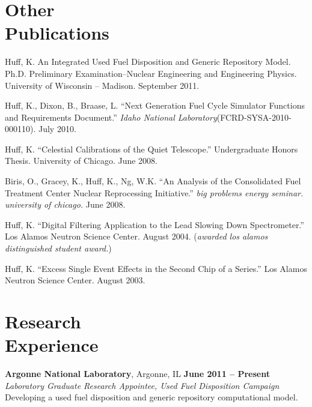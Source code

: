 \documentclass[margin,line]{resume}
\begin{document}
\begin{resume}
    \section{\mysidestyle Other\\Publications}
    \begin{bibenum}
      \item Huff, K. An Integrated Used Fuel Disposition and Generic Repository Model. 
        Ph.D. Preliminary Examination--Nuclear Engineering and Engineering 
        Physics. University of Wisconsin -- Madison.  September 2011. 
      \item Huff, K., Dixon, B., Braase, L. ``Next Generation Fuel Cycle Simulator Functions and Requirements Document.'' 
        \emph{Idaho National Laboratory}(FCRD-SYSA-2010-000110). July 2010. 
      \item Huff, K. ``Celestial Calibrations of the Quiet Telescope.''
        Undergraduate Honors Thesis. University of Chicago. June 2008.
      \item Biris, O., Gracey, K., Huff, K., Ng, W.K.  
        ``An Analysis of the Consolidated Fuel Treatment Center Nuclear 
        Reprocessing Initiative.''
        \emph{big problems energy seminar. university of chicago.} June 2008.
      \item Huff, K. ``Digital Filtering Application to the Lead Slowing Down 
        Spectrometer.'' Los Alamos Neutron Science Center. August 2004.  %
        (\emph{awarded los alamos distinguished student award.}) 
      \item Huff, K. ``Excess Single Event Effects in the Second Chip of a Series.'' 
        Los Alamos Neutron Science Center. August 2003. 
    \end{bibenum}

    \section{\mysidestyle Research\\Experience}
    \textbf{Argonne National Laboratory}, Argonne, IL \hfill \textbf{June 2011 -- Present}\\
		\textsl{Laboratory Graduate Research Appointee, Used Fuel Disposition Campaign}\\ 
		Developing a used fuel disposition and generic repository computational model.


\end{resume}
\end{document}
